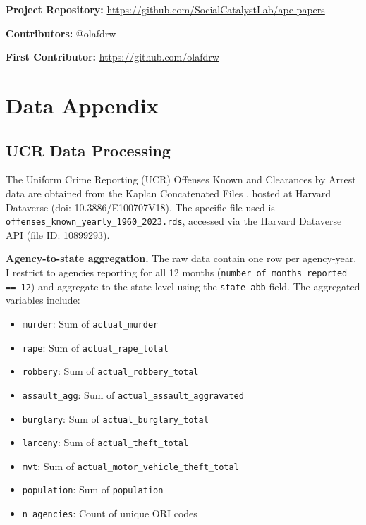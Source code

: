 \documentclass[12pt]{article}
\begin{document}
\noindent\textbf{Project Repository:} \url{https://github.com/SocialCatalystLab/ape-papers}

\noindent\textbf{Contributors:} @olafdrw

\noindent\textbf{First Contributor:} \url{https://github.com/olafdrw}

\label{apep_main_text_end}
\newpage


\newpage
\appendix

\section{Data Appendix}

\subsection{UCR Data Processing}

The Uniform Crime Reporting (UCR) Offenses Known and Clearances by Arrest data are obtained from the Kaplan Concatenated Files \citep{kaplan2021ucr}, hosted at Harvard Dataverse (doi: 10.3886/E100707V18). The specific file used is \texttt{offenses\_known\_yearly\_1960\_2023.rds}, accessed via the Harvard Dataverse API (file ID: 10899293).

\textbf{Agency-to-state aggregation.} The raw data contain one row per agency-year. I restrict to agencies reporting for all 12 months (\texttt{number\_of\_months\_reported == 12}) and aggregate to the state level using the \texttt{state\_abb} field. The aggregated variables include:
\begin{itemize}
\item \texttt{murder}: Sum of \texttt{actual\_murder}
\item \texttt{rape}: Sum of \texttt{actual\_rape\_total}
\item \texttt{robbery}: Sum of \texttt{actual\_robbery\_total}
\item \texttt{assault\_agg}: Sum of \texttt{actual\_assault\_aggravated}
\item \texttt{burglary}: Sum of \texttt{actual\_burglary\_total}
\item \texttt{larceny}: Sum of \texttt{actual\_theft\_total}
\item \texttt{mvt}: Sum of \texttt{actual\_motor\_vehicle\_theft\_total}
\item \texttt{population}: Sum of \texttt{population}
\item \texttt{n\_agencies}: Count of unique ORI codes
\end{itemize}
\end{document}
